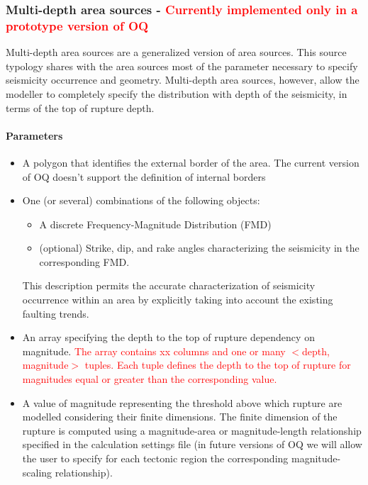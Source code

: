 \subsubsection{Multi-depth area sources - \textcolor{red}{Currently 
implemented only in a prototype version of OQ}}
\label{hazard:seismic_source_types:multiDepthAreaSources}
Multi-depth area sources are a generalized version of area sources. This
source typology shares with the area sources most of the parameter 
necessary to specify seismicity  occurrence and geometry. 
%
Multi-depth area sources, however, allow the modeller to completely specify 
the distribution with depth of the seismicity, in terms of the top of 
rupture depth.
%
\paragraph{Parameters}
\begin{itemize}
\item A polygon that identifies the external border of the area. 
The current version of OQ doesn't support the definition 
of internal borders
\item One (or several) combinations of the following objects:
\begin{itemize}
	\item A discrete Frequency-Magnitude Distribution (FMD)
	\item (optional) Strike, dip, and rake angles characterizing the 
	seismicity in the corresponding FMD.
\end{itemize}
%
This description permits the accurate characterization of seismicity 
occurrence within an area by explicitly taking into account the existing 
faulting trends. 
%
\item An array specifying the depth to the top of rupture dependency on 
magnitude. \textcolor{red}{The array contains xx columns and one or many $<$depth, magnitude$>$ 
tuples. Each tuple defines the depth to the top of rupture for magnitudes 
equal or greater than the corresponding value.}
%
\item A value of magnitude representing the threshold above which rupture 
are modelled considering their finite dimensions. The finite dimension of the 
rupture is computed using a magnitude-area or magnitude-length relationship 
specified in the calculation settings file (in future versions of OQ we will 
allow the user to specify for each tectonic region the corresponding 
magnitude-scaling relationship).
\end{itemize}
%

